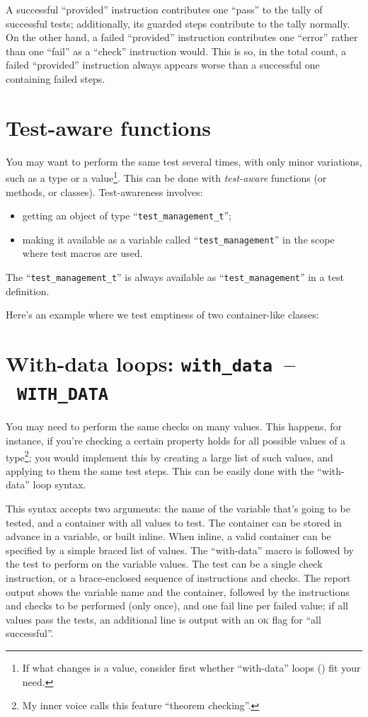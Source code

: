 \documentclass[twoside, a4paper, article]{memoir}
\newcommand*\testudocolor{\color{red!80!blue}}
\newcommand*\testudo[1]{\texttt{\testudocolor{}#1}}
\newcommand*\testudopair[2]{\testudo{#1}~--~\testudo{#2}}
\newcommand\chaptertestudopair[3]{%
  \chapter[#1]{#1: \testudopair{#2}{#3}}}
\providecommand\typesetexample[1]{%
}
\begin{document}
A successful ``provided'' instruction contributes one ``pass'' to the tally of
successful tests; additionally, its guarded steps contribute to the tally
normally.  On the other hand, a failed ``provided'' instruction contributes one
``error'' rather than one ``fail'' as a ``check'' instruction would.  This is
so, in the total count, a failed ``provided'' instruction always appears worse
than a successful one containing failed steps.

\chapter{Test-aware functions}
\label{cha:test-aware-functions}

You may want to perform the same test several times, with only minor
variations, such as a type or a value\footnote{If what changes is a value,
  consider first whether ``with-data'' loops () fit
  your need.}.  This can be done with \emph{test-aware} functions (or methods,
or classes).  Test-awareness involves:
\begin{itemize}
\item getting an object of type ``\texttt{test\_management\_t}'';
\item making it available as a variable called ``\texttt{test\_management}'' in
  the scope where test macros are used.
\end{itemize}
The ``\texttt{test\_management\_t}'' is always available as
``\texttt{test\_management}'' in a test definition.

Here's an example where we test emptiness of two container-like classes:

\typesetexample{test-aware-functions}


\chaptertestudopair{With-data loops}{with\_data}{WITH\_DATA}
\label{cha:with-data-loops}

You may need to perform the same checks on many values.  This happens, for
instance, if you're checking a certain property holds for all possible values
of a type\footnote{My inner voice calls this feature ``theorem checking''.};
you would implement this by creating a large list of such values, and applying
to them the same test steps.  This can be easily done with the ``with-data''
loop syntax.

This syntax accepts two arguments: the name of the variable that's going to be
tested, and a container with all values to test.  The container can be stored
in advance in a variable, or built inline.  When inline, a valid container can
be specified by a simple braced list of values.  The ``with-data'' macro is
followed by the test to perform on the variable values.  The test can be a
single check instruction, or a brace-enclosed sequence of instructions and
checks.  The report output shows the variable name and the container, followed
by the instructions and checks to be performed (only once), and one fail line
per failed value; if all values pass the tests, an additional line is output
with an \textsc{ok} flag for ``all successful''.
\end{document}
